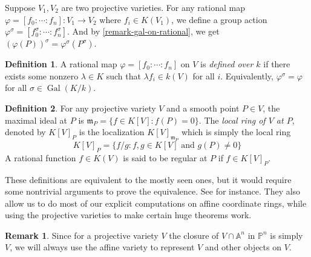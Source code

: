 \documentclass[12pt]{article}
\theoremstyle{remark}
\theoremstyle{definition}
\newtheorem{remark}{Remark}[subsection]
\newtheorem{definition}{Definition}[subsection]
\newcommand{\s}[0]{\sigma}
\newcommand{\A}[0]{\mathbb{A}}
\newcommand{\Pc}{\mathbb{P}}   %
\newcommand{\Gal}[0]{\operatorname{Gal}}
\begin{document}
            Suppose $V_1, V_2$ are two projective varieties. For any rational map $\varphi=[f_0:\cdots:f_n]:V_1\to V_2$ where $f_i\in K(V_1)$, we define a group action $\varphi^\s=[f_0^\s:\cdots:f_n^\s]$. And by \autoref{remark-gal-on-rational}, we get $(\varphi(P))^\s=\varphi^\s(P^\s)$.
            \begin{definition}
                A rational map $\varphi=[f_0:\cdots:f_n]$ on $V$ is \textit{defined over $k$} if there exists some nonzero $\lambda\in K$ such that $\lambda f_i\in k(V)$ for all $i$. Equivalently, $\varphi^\s=\varphi$ for all $\s\in\Gal(K/k)$.
            \end{definition}
            \begin{definition}
                For any projective variety $V$ and a smooth point $P\in V$, the maximal ideal at $P$ is $\mathfrak m_P=\{f\in K[V]:f(P)=0\}$. The \textit{local ring of $V$ at $P$}, denoted by $K[V]_P$ is the localization $K[V]_{\mathfrak m_P}$ which is simply the local ring
                \[K[V]_P=\{f/g:f, g\in K[V]\text{ and } g(P)\neq 0\}\]
                A rational function $f\in K(V)$ is said to be regular at $P$ if $f\in K[V]_P$.
            \end{definition}
            \noindent These definitions are equivalent to the mostly seen ones, but it would require some nontrivial arguments to prove the equivalence. See \cite{hartshorne_2010_algebraic} for instance. They also allow us to do most of our explicit computations on affine coordinate rings, while using the projective varieties to make certain huge theorems work.
            \begin{remark}
                Since for a projective variety $V$ the closure of $V\cap \A^n$ in $\Pc^n$ is simply $V$, we will always use the affine variety to represent $V$ and other objects on $V$.
            \end{remark}
            
            
            
            
\end{document}
